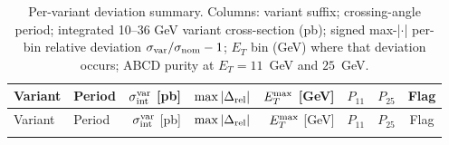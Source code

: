 \documentclass[11pt]{article}
\begin{document}
\begin{longtable}{l l r r r r r c}
\caption{Per-variant deviation summary. Columns: variant suffix; crossing-angle
period; integrated 10--36 GeV variant cross-section (pb); signed max-|$\cdot$|
per-bin relative deviation $\sigma_{\rm var}/\sigma_{\rm nom}-1$;
$E_T$ bin (GeV) where that deviation occurs; ABCD purity at
$E_T = 11$~GeV and $25$~GeV.}\label{tab:devs}\\
\toprule
Variant & Period & $\sigma^{\rm var}_{\rm int}$ [pb]
         & $\max |\Delta_{\rm rel}|$ & $E_T^{\rm max}$ [GeV]
         & $P_{11}$ & $P_{25}$ & Flag \\
\midrule
\endfirsthead
\toprule
Variant & Period & $\sigma^{\rm var}_{\rm int}$ [pb]
         & $\max |\Delta_{\rm rel}|$ & $E_T^{\rm max}$ [GeV]
         & $P_{11}$ & $P_{25}$ & Flag \\
\midrule
\endhead
\bottomrule
\endfoot


\end{longtable}
\end{document}
